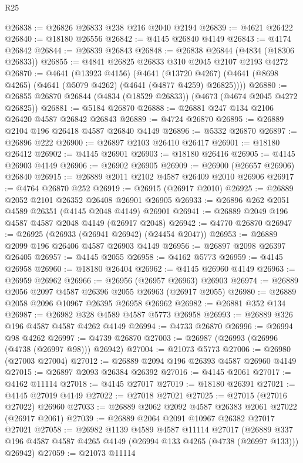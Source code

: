 \begin{lexlean}{R25}
\begin{coremodule}
@26838 := @26826 @26833 @238 @216 @2040 @2194
@26839 := @4621 @26422
@26840 := @18180 @26556
@26842 := @4145 @26840 @4149
@26843 := @4174 @26842
@26844 := @26839 @26843
@26848 := @26838 @26844 (@4834 (@18306 @26833))
@26855 := @4841 @26825 @26833 @310 @2045 @2107 @2193 @4272
@26870 := @4641
    (@13923 @4156)
    (@4641 (@13720 @4267) (@4641 (@8698 @4265) (@4641 (@5079 @4262) (@4641 (@4877 @4259) @26825))))
@26880 := @26855 @26870 @26844 (@4834 (@18529 @26833)) (@4673 (@4674 @2045 @4272 @26825))
@26881 := @5184 @26870
@26888 := @26881 @247 @134 @2106 @26420 @4587 @26842 @26843
@26889 := @4724 @26870
@26895 := @26889 @2104 @196 @26418 @4587 @26840 @4149
@26896 := @5332 @26870
@26897 := @26896 @222
@26900 := @26897 @2103 @26410 @26417
@26901 := @18180 @26412
@26902 := @4145 @26901
@26903 := @18180 @26416
@26905 := @4145 @26903 @4149
@26906 := @26902 @26905
@26909 := @26900 (@26657 @26906) @26840
@26915 := @26889 @2011 @2102 @4587 @26409 @2010 @26906
@26917 := @4764 @26870 @252
@26919 := @26915 (@26917 @2010)
@26925 := @26889 @2052 @2101 @26352 @26408 @26901 @26905
@26933 := @26896 @262 @2051 @4589 @26351 (@4145 @2048 @4149) @26901
@26941 := @26889 @2049 @196 @4587 @4587 @2048 @4149 (@26917 @2048)
@26942 := @4770 @26870
@26947 := @26925 (@26933 (@26941 @26942) (@24454 @2047))
@26953 := @26889 @2099 @196 @26406 @4587 @26903 @4149
@26956 := @26897 @2098 @26397 @26405
@26957 := @4145 @2055
@26958 := @4162 @5773
@26959 := @4145 @26958
@26960 := @18180 @26404
@26962 := @4145 @26960 @4149
@26963 := @26959 @26962
@26966 := @26956 (@26957 @26963) @26903
@26974 := @26889 @2056 @2097 @4587 @26396 @2055 @26963 (@26917 @2055)
@26980 := @26889 @2058 @2096 @10967 @26395 @26958 @26962
@26982 := @26881 @352 @134
@26987 := @26982 @328 @4589 @4587 @5773 @26958
@26993 := @26889 @326 @196 @4587 @4587 @4262 @4149
@26994 := @4733 @26870
@26996 := @26994 @98 @4262
@26997 := @4739 @26870
@27003 := @26987 (@26993 (@26996 (@4738 (@26997 @98))) @26942)
@27004 := @21073 @5773
@27006 := @26980 (@27003 @27004)
@27012 := @26889 @2094 @196 @26393 @4587 @26960 @4149
@27015 := @26897 @2093 @26384 @26392
@27016 := @4145 @2061
@27017 := @4162 @11114
@27018 := @4145 @27017
@27019 := @18180 @26391
@27021 := @4145 @27019 @4149
@27022 := @27018 @27021
@27025 := @27015 (@27016 @27022) @26960
@27033 := @26889 @2062 @2092 @4587 @26383 @2061 @27022 (@26917 @2061)
@27039 := @26889 @2064 @2091 @10967 @26382 @27017 @27021
@27058 := @26982
    @1139
    @4589
    @4587
    @11114
    @27017
    (@26889 @337 @196 @4587 @4587 @4265 @4149 (@26994 @133 @4265 (@4738 (@26997 @133))) @26942)
@27059 := @21073 @11114

\end{coremodule}
\end{lexlean}
